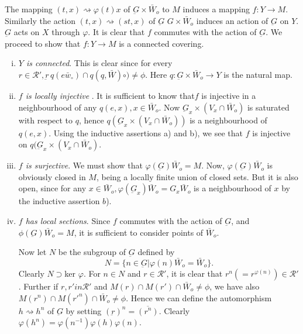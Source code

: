 {{The mapping $(t,x) \rightsquigarrow \varphi (t) x$ of $\underbar{G}
\times \bar{W}_o$ to $M$ induces a mapping $f:Y \to M$. Similarly the
action $(t,x) \rightsquigarrow (st,x)$ of $\underbar{G}$ $G
\times \bar{W}_o$ induces an action of $\underbar{G}$ on
$Y$. $\underbar{G}$ acts on $X$ through $\varphi$. It is clear that
$f$ commutes with the action of $\underbar{G}$. We proceed to show
that $f:Y \to M$ is a connected covering. 
\begin{enumerate}[(i)]
\item \textit{$Y$ is connected}. This is clear since for every $r \in
  \mathcal{R}', \underbar{r}\, q (e \bar{w}_\circ)\cap q (q,
  \bar{W})\circ) \neq \phi$. Here $q :
  \underbar{G} \times \bar{W}_o \to Y$ is the natural map. 
\item \textit{ $f$ is locally injective }. It is sufficient to know
  that\pageoriginale $f$ is injective in a neighbourhood of any $q(e, x),x \in
  \bar{W}_o$. Now $\underbar{G}_x \times (V_x \cap \bar{W}_o)$ is
  saturated with respect to $q$, hence $q (\underbar{G}_x \times (V_x
  \cap \bar{W}_o))$ is a neighbourhood of $q(e,x)$. Using the
  inductive assertions a) and b), we see that $f$  is injective
  on $ q (\underbar{G}_x \times (V_x \cap \bar{W}_o)$. 
\item \textit{$f$ is surjective}. We must show that  $\varphi
  (\underbar{G}) \bar{W}_o =M$. Now, $\varphi (\underbar{G})
  \bar{W}_o$ is obviously closed in $M$, being a locally finite union
  of closed sets. But it is also open, since for any  $ x \in
  \bar{W}_o ,\varphi (\underbar{G}_x) \bar{W}_o = G_x \bar{W}_o$ is a
  neighbourhood of $x$ by the inductive assertion $b$). 
\item \textit{$f$ has local sections}. Since $f$  commutes with the
  action of $\underbar{G}$, and $\phi (\underbar{G}) \bar{W}_o =M$, it is
  sufficient to consider points of $\bar{W}_o$. 

Now let $N$ be the subgroup of $\underbar{G}$ defined by 
$$
N =\{ n \in \underbar{G}| \varphi(n) \bar{W}_o = \bar{W}_o \}.
$$
Clearly $N \supset $ker $\varphi$. For $n \in N$ and $r \in
\mathcal{R}'$, it is clear that $r^n(=r^{\varphi(n)}) \in
\mathcal{R}'$.  Further if $r,r' in \mathcal{R}'$ and $M(r) \cap M(r')
\cap \bar{W}_o \neq \phi$, we have also $M(r^n) \cap M(r'^n) \cap
\bar{W}_o \neq \phi$. Hence we can define the automorphism $h
\rightsquigarrow h^n$ of $\underbar{G}$ by setting $(\underbar{r})^n =
\overline{(r^n)}$. Clearly $\varphi(h^n) = \varphi(n^{-1}) \varphi(h)
\varphi(n)$. 


\end{enumerate}}}
